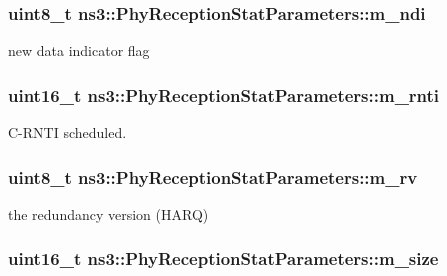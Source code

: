 \subsubsection[{\texorpdfstring{m\+\_\+ndi}{m_ndi}}]{\setlength{\rightskip}{0pt plus 5cm}uint8\+\_\+t ns3\+::\+Phy\+Reception\+Stat\+Parameters\+::m\+\_\+ndi}\hypertarget{structns3_1_1PhyReceptionStatParameters_ab254f688b99a6acb6550dc1daee3acc2}{}\label{structns3_1_1PhyReceptionStatParameters_ab254f688b99a6acb6550dc1daee3acc2}


new data indicator flag 

\subsubsection[{\texorpdfstring{m\+\_\+rnti}{m_rnti}}]{\setlength{\rightskip}{0pt plus 5cm}uint16\+\_\+t ns3\+::\+Phy\+Reception\+Stat\+Parameters\+::m\+\_\+rnti}\hypertarget{structns3_1_1PhyReceptionStatParameters_a7413a05de70354099522d41ef794f5ab}{}\label{structns3_1_1PhyReceptionStatParameters_a7413a05de70354099522d41ef794f5ab}


C-\/\+R\+N\+TI scheduled. 

\subsubsection[{\texorpdfstring{m\+\_\+rv}{m_rv}}]{\setlength{\rightskip}{0pt plus 5cm}uint8\+\_\+t ns3\+::\+Phy\+Reception\+Stat\+Parameters\+::m\+\_\+rv}\hypertarget{structns3_1_1PhyReceptionStatParameters_a1b1f247cff7d15da79333f6c94e56d0b}{}\label{structns3_1_1PhyReceptionStatParameters_a1b1f247cff7d15da79333f6c94e56d0b}


the redundancy version (H\+A\+RQ) 

\subsubsection[{\texorpdfstring{m\+\_\+size}{m_size}}]{\setlength{\rightskip}{0pt plus 5cm}uint16\+\_\+t ns3\+::\+Phy\+Reception\+Stat\+Parameters\+::m\+\_\+size}\hypertarget{structns3_1_1PhyReceptionStatParameters_aefc0e5c7b0006dec1ca15a4eadf71eb4}{}\label{structns3_1_1PhyReceptionStatParameters_aefc0e5c7b0006dec1ca15a4eadf71eb4}



